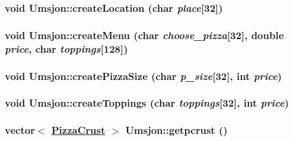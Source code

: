 \hypertarget{class_umsjon_6827be731c8d50370297264676be442f}{
\subsubsection[createLocation]{\setlength{\rightskip}{0pt plus 5cm}void Umsjon::create\-Location (char {\em place}\mbox{[}32\mbox{]})}}
\label{class_umsjon_6827be731c8d50370297264676be442f}


\hypertarget{class_umsjon_ce183afe9e7ad9a7492ac2241e2481e5}{
\subsubsection[createMenu]{\setlength{\rightskip}{0pt plus 5cm}void Umsjon::create\-Menu (char {\em choose\_\-pizza}\mbox{[}32\mbox{]}, double {\em price}, char {\em toppings}\mbox{[}128\mbox{]})}}
\label{class_umsjon_ce183afe9e7ad9a7492ac2241e2481e5}


\hypertarget{class_umsjon_9b94d4f7ba3bbc2c46cc7bdce8f09d61}{
\subsubsection[createPizzaSize]{\setlength{\rightskip}{0pt plus 5cm}void Umsjon::create\-Pizza\-Size (char {\em p\_\-size}\mbox{[}32\mbox{]}, int {\em price})}}
\label{class_umsjon_9b94d4f7ba3bbc2c46cc7bdce8f09d61}


\hypertarget{class_umsjon_b4c5d68540dc069a5871e57482a44454}{
\subsubsection[createToppings]{\setlength{\rightskip}{0pt plus 5cm}void Umsjon::create\-Toppings (char {\em toppings}\mbox{[}32\mbox{]}, int {\em price})}}
\label{class_umsjon_b4c5d68540dc069a5871e57482a44454}


\hypertarget{class_umsjon_1ba4091781dbf5acfd11d9bbd3c476c1}{
\subsubsection[getpcrust]{\setlength{\rightskip}{0pt plus 5cm}vector$<$ \hyperlink{class_pizza_crust}{Pizza\-Crust} $>$ Umsjon::getpcrust ()}}
\label{class_umsjon_1ba4091781dbf5acfd11d9bbd3c476c1}



